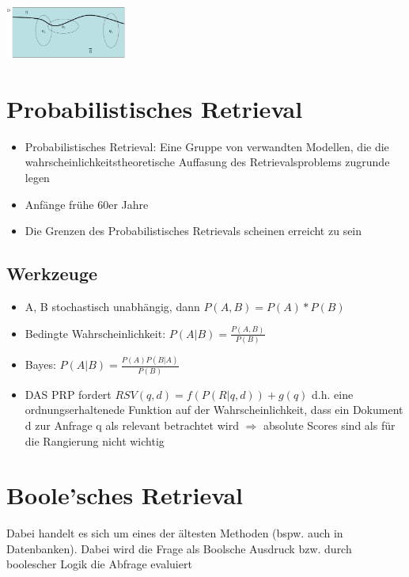 \documentclass{report}
\newenvironment{Figure}
	{\par\medskip\noindent\minipage{\linewidth}}
	{\endminipage\par\medskip}
\theoremstyle{definition}
\theoremstyle{example}
\begin{document}
\begin{Figure}
   \centering
    \includegraphics[width=150px]{img/BeispielVisualisiert.png}
        \label{fig:Beispiel visualisiert eines PRP}
\end{Figure}

\section{Probabilistisches Retrieval}
\begin{itemize}
   \item Probabilistisches Retrieval: Eine Gruppe von verwandten Modellen, die die wahrscheinlichkeitstheoretische Auffasung des Retrievalsproblems zugrunde legen
   \item Anfänge frühe 60er Jahre
   \item Die Grenzen des Probabilistisches Retrievals scheinen erreicht zu sein
\end{itemize}

\subsection{Werkzeuge}
\begin{itemize}
   \item A, B stochastisch unabhängig, dann $P(A,B) = P(A)*P(B)$
   \item Bedingte Wahrscheinlichkeit: $P(A|B)=\frac{P(A,B)}{P(B)}$
   \item Bayes: $P(A|B) = \frac{P(A)P(B|A)}{P(B)}$
   \item DAS PRP fordert $RSV(q,d) = f(P(R|q,d)) + g(q)$ d.h. eine ordnungserhaltenede Funktion auf der Wahrscheinlichkeit, dass ein Dokument d zur Anfrage q als relevant betrachtet wird
   \subitem $\Rightarrow$ absolute Scores sind als für die Rangierung nicht wichtig 
\end{itemize}

\section{Boole'sches Retrieval}
Dabei handelt es sich um eines der ältesten Methoden (bspw. auch in Datenbanken). Dabei wird die Frage als Boolsche Ausdruck bzw. durch boolescher Logik die Abfrage evaluiert
\end{document}
